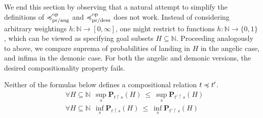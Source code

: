 We end this section by observing that a natural attempt to simplify  the definitions of 
 $\preccurlyeq^{\text{op}}_{\text{pr/ang}}$ and $\preccurlyeq^{\text{op}}_{\text{pr/dem}}$ does not work. Instead of considering arbitrary weightings
 $h \colon \mathbb{N} \to [0,\infty]$, one might restrict to  
 functions $h \colon \mathbb{N} \to \{0,1\}$, which can be viewed as specifying goal subsets $H \subseteq \mathbb{N}$.
 Proceeding analogously to above, we compare suprema of probabilities of landing in $H$ in the angelic case, and infima in the demonic case. For both the angelic and demonic versions, the desired compositionality property fails.
\begin{proposition}
Neither of the formulas below defines a compositional relation $t \preccurlyeq t'$. %
 \begin{align*}
 & \forall H \subseteq \mathbb{N}  ~~ \sup_s  \mathbf{P}_{t\restriction s} (H)~ \leq~ \sup_s \mathbf{P}_{t'\restriction s} (H)
\\
 & \forall H \subseteq \mathbb{N}  ~~ \inf_s  \mathbf{P}_{t\restriction s} (H)~ \leq~ \inf_s \mathbf{P}_{t'\restriction s} (H)
\end{align*}
\end{proposition}


 
 





